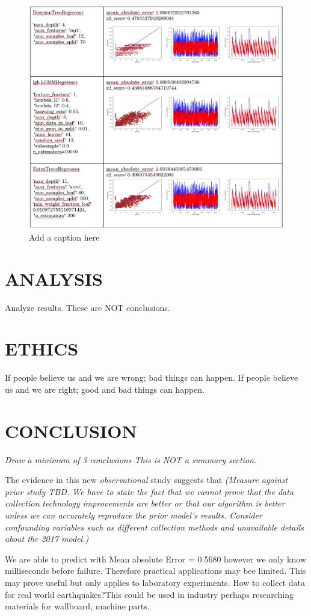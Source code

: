 \documentclass[]{llncs}
\begin{document}
\begin{figure}
	\centering
	\includegraphics[width=1\linewidth]{../GPUProject/Results2.PNG}
	\caption{Add a caption here}
	\label{fig:morethan90percent}
\end{figure}

\section{ANALYSIS}
Analyze results.
These are NOT conclusions.
\section{ETHICS}
If people believe us and we are wrong; bad things can happen. If people believe us and we are right; good and bad things can happen.
\section{CONCLUSION}
{\em Draw a minimum of 3 conclusions  This is NOT a summary section.} 
\par



The evidence in this new {\em observational} study suggests that {\em (Measure against prior study TBD. We have to state the fact that we cannot prove that the data collection technology improvements are better or that our algorithm is better unless we can accurately reproduce the prior model's results. Consider confounding variables such as different collection methods and unavailable details about the 2017 model.)}\par

We are able to predict with Mean absolute Error = 0.5680 however we  only know milliseconds before failure.
 Therefore practical applications may bee limited. This may prove useful but only applies to laboratory experiments. How to collect data for real world earthquakes?This could be used in industry perhaps researching materials for wallboard, machine parts.
\par



\end{document}
